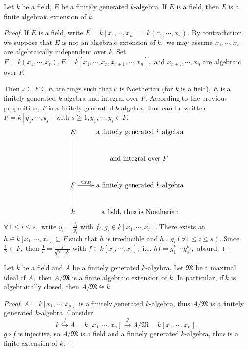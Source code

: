 \begin{prop}
Let $k$ be a field, $E$ be a finitely generated $k$-algebra. If $E$
is a field, then $E$ is a finite algebraic extension of $k.$
\end{prop}
\begin{proof}
If $E$ is a field, write $E=k[x_1,\cdots,x_n]=k(x_1,\cdots,x_n).$ By
contradiction, we suppose that $E$ is not an algebraic extension of
$k,$ we may assume $x_1,\cdots,x_r$ are algebraically independent
over $k.$ Set $F=k(x_1,\cdots,x_r),
E=k[x_1,\cdots,x_r,x_{r+1},\cdots,x_n],$ and $x_{r+1},\cdots,x_n$
are algebraic over $F.$

Then $k\subseteq F\subseteq E$ are rings such that $k$ is Noetherian
(for $k$ is a field), $E$ is a finitely generated $k$-algebra and
integral over $F.$ According to the previous proposition, $F$ is a
finitely generated $k$-algebra, thus can be written
$F=k[y_1,\cdots,y_s]$ with $s\geqslant 1, y_1,\cdots,y_s\in F.$
\[ \xymatrix{
   E \ar@{-}[dd] & \text{a finitely generated $k$ algebra} \\
   & \text{and integral over $F$ }      \\
   F \ar[r]^-{\text{thus}} \ar@{-}[d] & \text{a finitely generated
   $k$-algebra}             \\
   k & \text{a field, thus is Noetherian} }  \]
$\forall 1\leqslant i\leqslant s,$ write $y_i=\frac{f_i}{g_i}$ with
$f_i,g_i\in k[x_1,\cdots,x_r].$ There exists an $h\in
k[x_1,\cdots,x_r]\subseteq F$ such that $h$ is irreducible and
$h\nmid g_i(\forall 1\leqslant i\leqslant s).$ Since $\frac{1}{h}\in
F,$ then $\frac{1}{h}=\frac{f}{g_1^{k_1}\cdots g_s^{k_s}}$ with
$f\in k[x_1,\cdots,x_r],$ i.e. $hf=g_1^{k_1}\cdots g_s^{k_s},$
absurd.
\end{proof}
\begin{cor}
Let $k$ be a field and $A$ be a finitely generated $k$-algebra. Let
$\mathfrak{M}$ be a maximal ideal of $A,$ then $A/\mathfrak{M}$ is a
finite algebraic extension of $k.$ In particular, if $k$ is
algebraically closed, then $A/\mathfrak{M}\cong k.$
\end{cor}
\begin{proof}
$A=k[x_1,\cdots,x_n]$ is a finitely generated $k$-algebra, thus
$A/\mathfrak{M}$ is a finitely generated $k$-algebra. Consider
$$k\stackrel{f}{\hookrightarrow}
A=k[x_1,\cdots,x_n]\stackrel{g}{\rightarrow}
A/\mathfrak{M}=k[\bar{x}_1,\cdots,\bar{x}_n],$$ $g\circ f$ is
injective, so $A/\mathfrak{M}$ is a field and a finitely generated
$k$-algebra, thus is a finite extension of $k.$
\end{proof}
